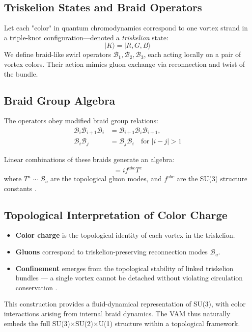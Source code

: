 \subsection*{Triskelion States and Braid Operators}

Let each "color" in quantum chromodynamics correspond to one vortex strand in a triple-knot configuration—denoted a \textit{triskelion} state:
\[
|K\rangle = |R, G, B\rangle
\]
We define braid-like swirl operators \( \mathcal{B}_1, \mathcal{B}_2, \mathcal{B}_3 \), each acting locally on a pair of vortex colors. Their action mimics gluon exchange via reconnection and twist of the bundle.

\subsection*{Braid Group Algebra}

The operators obey modified braid group relations:
\begin{align}
\mathcal{B}_i \mathcal{B}_{i+1} \mathcal{B}_i &= \mathcal{B}_{i+1} \mathcal{B}_i \mathcal{B}_{i+1}, \\
\mathcal{B}_i \mathcal{B}_j &= \mathcal{B}_j \mathcal{B}_i \quad \text{for } |i-j| > 1
\end{align}

Linear combinations of these braids generate an algebra:
\begin{align}
[T^a, T^b] = i f^{abc} T^c
\end{align}
where \( T^a \sim \mathcal{B}_a \) are the topological gluon modes, and \( f^{abc} \) are the SU(3) structure constants \cite{witten1989quantum}.

\subsection*{Topological Interpretation of Color Charge}

\begin{itemize}
    \item \textbf{Color charge} is the topological identity of each vortex in the triskelion.
    \item \textbf{Gluons} correspond to triskelion-preserving reconnection modes \( \mathcal{B}_a \).
    \item \textbf{Confinement} emerges from the topological stability of linked triskelion bundles — a single vortex cannot be detached without violating circulation conservation \cite{kauffman1991knots, faddeev1997knots}.
\end{itemize}

This construction provides a fluid-dynamical representation of SU(3), with color interactions arising from internal braid dynamics. The VAM thus naturally embeds the full SU(3)$\times$SU(2)$\times$U(1) structure within a topological framework.